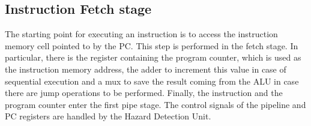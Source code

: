 \subsection{Instruction Fetch stage}
The starting point for executing an instruction is to access the instruction memory cell pointed to by the PC. This step is performed in the fetch stage. In particular, there is the register containing the program counter, which is used as the instruction memory address, the adder to increment this value in case of sequential execution and a mux to save the result coming from the ALU in case there are jump operations to be performed. Finally, the instruction and the program counter enter the first pipe stage. The control signals of the pipeline and PC registers are handled by the Hazard Detection Unit.

